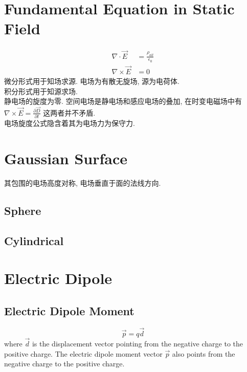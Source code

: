 \documentclass[a4paper]{report}
\begin{document}
\section{Fundamental Equation in Static Field}
\begin{align*}
    \nabla\cdot\vec{E}&=\frac{\rho _{all}}{\epsilon _0}\\
    \nabla\times\vec{E}&=0
\end{align*}
微分形式用于知场求源. 
电场为有散无旋场, 源为电荷体.\\ 
积分形式用于知源求场. \\
静电场的旋度为零. 空间电场是静电场和感应电场的叠加, 在时变电磁场中有$\nabla\times \vec{E}=\frac{\partial \vec{D} }{\partial t} $ 这两者并不矛盾. \\

电场旋度公式隐含着其为电场力为保守力. 
\section{Gaussian Surface}
其包围的电场高度对称, 电场垂直于面的法线方向. 
\subsection{Sphere}
\subsection{Cylindrical}

\section{Electric Dipole}
\subsection{Electric Dipole Moment}
$$\vec{p}=q\vec{d}$$
where $ \vec{d} $ is the displacement vector pointing from the negative charge to the positive charge. The electric dipole moment vector $ \vec{p} $ also points from the negative charge to the positive charge.
\end{document}
